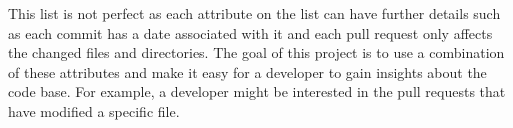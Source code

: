 This list is not perfect as each attribute on the list can have further details such as each commit has a date associated with it and each pull request only affects the changed files and directories. The goal of this project is to use a combination of these attributes and make it easy for a developer to gain insights about the code base. For example, a developer might be interested in the pull requests that have modified a specific file.